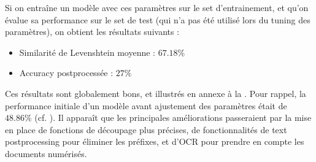             Si on entraîne un modèle avec ces paramètres sur le set d'entrainement, et qu'on évalue sa performance sur le set de test (qui n'a pas été utilisé lors du tuning des paramètres), on obtient les résultats suivants : 
            \begin{itemize}
                \item Similarité de Levenshtein moyenne : $67.18\%$
                \item Accuracy postprocessée : $27\%$
            \end{itemize}
            Ces résultats sont globalement bons, et illustrés en annexe à la .
            Pour rappel, la performance initiale d'un modèle avant ajustement des paramètres était de $48.86\%$ (cf. ).
            Il apparaît que les principales améliorations passeraient par la mise en place de fonctions de découpage plus précises, de fonctionnalités de text postprocessing pour éliminer les préfixes, et d'OCR pour prendre en compte les documents numérisés.
